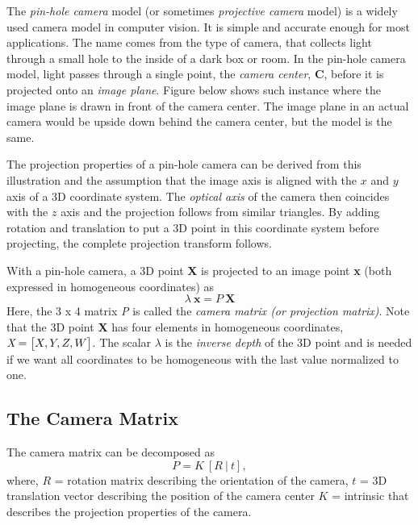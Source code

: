 \documentclass[a4paper,12pt]{extarticle}
\theoremstyle{mytheor}
\begin{document}
The \emph{pin-hole camera} model (or sometimes \emph{projective camera} model) is a widely used camera model in computer vision. It is simple and accurate enough for most applications. The name comes from the type of camera, that collects light through a small hole to the inside of a dark box or room. In the pin-hole camera model, light passes through a single point, the \emph{camera center}, \textbf{C}, before it is projected onto an \emph{image plane}. Figure below shows such instance where the image plane is drawn in front of the camera center. The image plane in an actual camera would be upside down behind the camera center, but the model is the same.


The projection properties of a pin-hole camera can be derived from this illustration and the assumption that the image axis is aligned with the $x$ and $y$ axis of a 3D coordinate system. The \emph{optical axis} of the camera then coincides with the $z$ axis and the projection follows from similar triangles. By adding rotation and translation to put a 3D point in this coordinate system before projecting, the complete projection transform follows.


With a pin-hole camera, a 3D point \textbf{X} is projected to an image point \textbf{x} (both expressed in homogeneous coordinates) as \medspace
\begin{equation}
\lambda \: \textbf{x} = P \: \textbf{X}
\end{equation}
Here, the 3 x 4 matrix \emph{P} is called the \emph{camera matrix (or projection matrix)}. Note that the 3D point \textbf{X} has four elements in homogeneous coordinates, $ \emph{X} = \begin{bmatrix} X, Y, Z, W \end{bmatrix} $. The scalar $\lambda$ is the \emph{inverse depth} of the 3D point and is needed if we want all coordinates to be homogeneous with the last value normalized to one.

\subsection{The Camera Matrix}
 
The camera matrix can be decomposed as \medspace
\begin{equation}
P = K \: [R \: | \: t],
\end{equation}
where, \newline $R$ = rotation matrix describing the orientation of the camera, \newline
$t$ = 3D translation vector describing the position of the camera center \newline
$K$ = intrinsic that describes the projection properties of the camera. \newline
\end{document}
